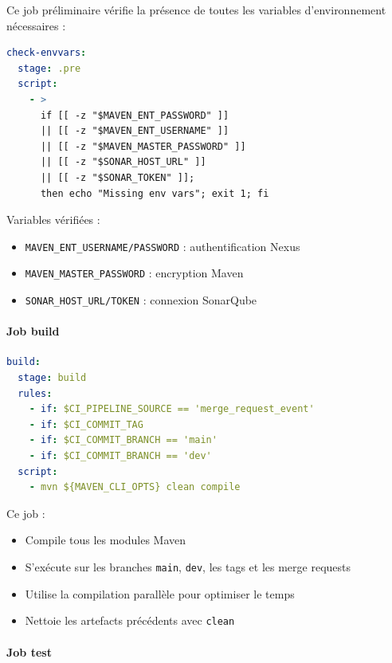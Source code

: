 Ce job préliminaire vérifie la présence de toutes les variables d'environnement nécessaires :
\begin{lstlisting}[language=yaml, caption=Verification des variables d'environnement]
check-envvars:
  stage: .pre
  script:
    - >
      if [[ -z "$MAVEN_ENT_PASSWORD" ]]
      || [[ -z "$MAVEN_ENT_USERNAME" ]]
      || [[ -z "$MAVEN_MASTER_PASSWORD" ]]
      || [[ -z "$SONAR_HOST_URL" ]]
      || [[ -z "$SONAR_TOKEN" ]];
      then echo "Missing env vars"; exit 1; fi
\end{lstlisting}

Variables vérifiées :
\begin{itemize}
    \item \texttt{MAVEN\_ENT\_USERNAME/PASSWORD} : authentification Nexus
    \item \texttt{MAVEN\_MASTER\_PASSWORD} : encryption Maven
    \item \texttt{SONAR\_HOST\_URL/TOKEN} : connexion SonarQube
\end{itemize}

\paragraph{Job build}

\vspace{0.3cm}
\begin{lstlisting}[language=yaml, caption=Job de build]
build:
  stage: build
  rules:
    - if: $CI_PIPELINE_SOURCE == 'merge_request_event'
    - if: $CI_COMMIT_TAG
    - if: $CI_COMMIT_BRANCH == 'main'
    - if: $CI_COMMIT_BRANCH == 'dev'
  script:
    - mvn ${MAVEN_CLI_OPTS} clean compile
\end{lstlisting}

Ce job :
\begin{itemize}
    \item Compile tous les modules Maven
    \item S'exécute sur les branches \texttt{main}, \texttt{dev}, les tags et les merge requests
    \item Utilise la compilation parallèle pour optimiser le temps
    \item Nettoie les artefacts précédents avec \texttt{clean}
\end{itemize}

\paragraph{Job test}

